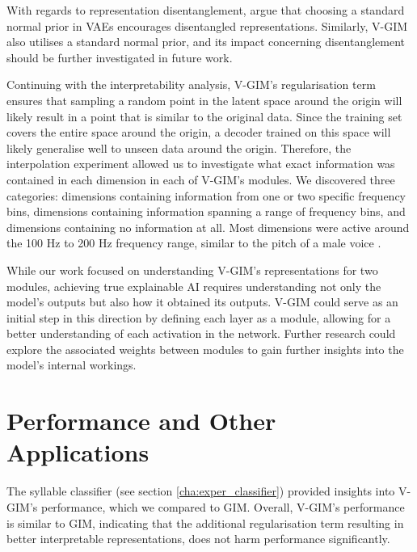 	With regards to representation disentanglement, \cite{burgessUnderstandingDisentanglingBeta2018} argue that choosing a standard normal prior in VAEs encourages disentangled representations. Similarly, V-GIM also utilises a standard normal prior, and its impact concerning disentanglement should be further investigated in future work.
	
	

	Continuing with the interpretability analysis, V-GIM's regularisation term ensures that sampling a random point in the latent space around the origin will likely result in a point that is similar to the original data. Since the training set covers the entire space around the origin, a decoder trained on this space will likely generalise well to unseen data around the origin. Therefore, the interpolation experiment allowed us to investigate what exact information was contained in each dimension in each of V-GIM's modules. We discovered three categories: dimensions containing information from one or two specific frequency bins, dimensions containing information spanning a range of frequency bins, and dimensions containing no information at all. Most dimensions were active around the 100 Hz to 200 Hz frequency range, similar to the pitch of a male voice \citep{rePreferencesVeryLow2012}.
	
	While our work focused on understanding V-GIM's representations for two modules, achieving true explainable AI requires understanding not only the model's outputs but also how it obtained its outputs. V-GIM could serve as an initial step in this direction by defining each layer as a module, allowing for a better understanding of each activation in the network. Further research could explore the associated weights between modules to gain further insights into the model's internal workings.

\section{Performance and Other Applications} 
	The syllable classifier (see section \ref{cha:exper_classifier}) provided insights into V-GIM's performance, which we compared to GIM. Overall, V-GIM's performance is similar to GIM, indicating that the additional regularisation term resulting in better interpretable representations, does not harm performance significantly.
	

